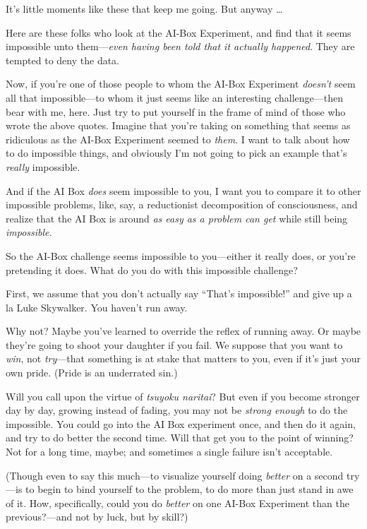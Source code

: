 {
 It's little moments like these that keep me going.
But anyway \ldots}

{
 Here are these folks who look at the AI-Box Experiment, and find
that it seems impossible unto them---\textit{even having been told that
it actually happened}. They are tempted to deny the data.}

{
 Now, if you're one of those people to whom the
AI-Box Experiment \textit{doesn't} seem all that
impossible---to whom it just seems like an interesting challenge---then
bear with me, here. Just try to put yourself in the frame of mind of
those who wrote the above quotes. Imagine that you're
taking on something that seems as ridiculous as the AI-Box Experiment
seemed to \textit{them}. I want to talk about how to do impossible
things, and obviously I'm not going to pick an example
that's \textit{really} impossible.}

{
 And if the AI Box \textit{does} seem impossible to you, I want you
to compare it to other impossible problems, like, say, a reductionist
decomposition of consciousness, and realize that the AI Box is around
\textit{as easy as a problem can get} while still being
\textit{impossible.}}

{
 So the AI-Box challenge seems impossible to you---either it really
does, or you're pretending it does. What do you do with
this impossible challenge?}

{
 First, we assume that you don't actually say
``That's
impossible!'' and give up a la Luke Skywalker. You
haven't run away.}

{
 Why not? Maybe you've learned to override the
reflex of running away. Or maybe they're going to shoot
your daughter if you fail. We suppose that you want to \textit{win},
not \textit{try}{}---that something is at stake that matters to you,
even if it's just your own pride. (Pride is an
underrated sin.)}

{
 Will you call upon the virtue of \textit{tsuyoku naritai}? But
even if you become stronger day by day, growing instead of fading, you
may not be \textit{strong enough} to do the impossible. You could go
into the AI Box experiment once, and then do it again, and try to do
better the second time. Will that get you to the point of winning? Not
for a long time, maybe; and sometimes a single failure
isn't acceptable.}

{
 (Though even to say this much---to visualize yourself doing
\textit{better} on a second try---is to begin to bind yourself to the
problem, to do more than just stand in awe of it. How, specifically,
could you do \textit{better} on one AI-Box Experiment than the
previous?---and not by luck, but by skill?)}

